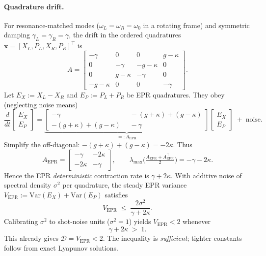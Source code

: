 \documentclass[11pt]{article}
\begin{document}
\paragraph{Quadrature drift.}
For resonance-matched modes ($\omega_L=\omega_R=\omega_0$ in a rotating frame) and symmetric damping $\gamma_L=\gamma_R=\gamma$, the drift in the ordered quadratures $\mathbf x=[X_L,P_L,X_R,P_R]^\top$ is
\[
A = \begin{bmatrix}
-\gamma & 0 & 0 & g-\kappa\\
0 & -\gamma & -g-\kappa & 0\\
0 & g-\kappa & -\gamma & 0\\
-g-\kappa & 0 & 0 & -\gamma
\end{bmatrix}.
\]
Let $E_X:=X_L-X_R$ and $E_P:=P_L+P_R$ be EPR quadratures. They obey (neglecting noise means)
\[
\frac{d}{dt}\begin{bmatrix}E_X\\E_P\end{bmatrix}
=
\underbrace{\begin{bmatrix}
-\gamma & \;\; -(g+\kappa) + (g-\kappa)\\
-(g+\kappa) + (g-\kappa) & \;\; -\gamma
\end{bmatrix}}_{=:A_{\mathrm{EPR}}}
\begin{bmatrix}E_X\\E_P\end{bmatrix}
\;+\; \text{noise}.
\]
Simplify the off-diagonal: $-(g+\kappa)+(g-\kappa)=-2\kappa$. Thus
\[
A_{\mathrm{EPR}}=\begin{bmatrix}-\gamma & -2\kappa\\ -2\kappa & -\gamma\end{bmatrix},
\qquad
\lambda_{\max}\big(\tfrac{A_{\mathrm{EPR}}+A_{\mathrm{EPR}}^\top}{2}\big)= -\gamma - 2\kappa.
\]
Hence the EPR \emph{deterministic} contraction rate is $\gamma+2\kappa$. With additive noise of spectral density $\sigma^2$ per quadrature, the steady EPR variance $V_{\mathrm{EPR}}:=\mathrm{Var}(E_X)+\mathrm{Var}(E_P)$ satisfies
\begin{equation}
V_{\mathrm{EPR}} \;\le\; \frac{2\sigma^2}{\gamma+2\kappa}.
\label{eq:VEPR}
\end{equation}
Calibrating $\sigma^2$ to shot-noise units ($\sigma^2=1$) yields $V_{\mathrm{EPR}}<2$ whenever
\begin{equation}
\gamma+2\kappa \;>\; 1.
\label{eq:simple_thresh}
\end{equation}
This already gives $\mathcal D=V_{\mathrm{EPR}}<2$. The inequality is \emph{sufficient}; tighter constants follow from exact Lyapunov solutions.
\end{document}
